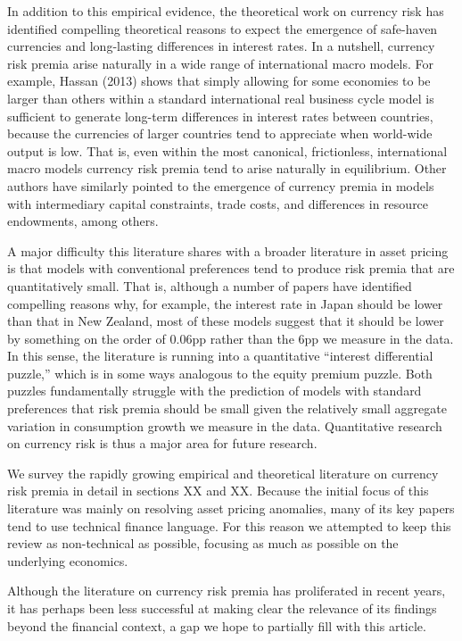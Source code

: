\documentclass[12pt,letter]{article}
\theoremstyle{break} \theorembodyfont{\normalfont\itshape}
\theoremstyle{break}
\theoremstyle{break} \theorembodyfont{\normalfont\itshape}
\theoremstyle{break} \theorembodyfont{\normalfont\itshape}
\begin{document}
In addition to this empirical evidence, the theoretical work on
currency risk has identified compelling theoretical reasons to expect
the emergence of safe-haven currencies and long-lasting differences in
interest rates. In a nutshell, currency risk premia arise naturally in
a wide range of international macro models. For example, Hassan (2013)
shows that simply allowing for some economies to be larger than others
within a standard international real business cycle model is
sufficient to generate long-term differences in interest rates between
countries, because the currencies of larger countries tend to
appreciate when world-wide output is low. That is, even within the
most canonical, frictionless, international macro models currency
risk premia tend to arise naturally in equilibrium. Other authors have
similarly pointed to the emergence of currency premia in models with
intermediary capital constraints, trade costs, and differences in
resource endowments, among others.

A major difficulty this literature shares with a broader literature in
asset pricing is that models with conventional preferences tend to
produce risk premia that are quantitatively small. That is, although a
number of papers have identified compelling reasons why, for example,
the interest rate in Japan should be lower than that in New Zealand,
most of these models suggest that it should be lower by something on
the order of 0.06pp rather than the 6pp we measure in the data. In
this sense, the literature is running into a quantitative ``interest
differential puzzle,'' which is in some ways analogous to the equity
premium puzzle. Both puzzles fundamentally struggle with the
prediction of models with standard preferences that risk premia should
be small given the relatively small aggregate variation in consumption
growth we measure in the data. Quantitative research on currency risk
is thus a major area for future research.

We survey the rapidly growing empirical and theoretical literature on
currency risk premia in detail in sections XX and XX. Because the
initial focus of this literature was mainly on resolving asset pricing
anomalies, many of its key papers tend to use technical finance language.
For this reason we attempted to keep this review as non-technical as
possible, focusing as much as possible on the underlying economics.

Although the literature on currency risk premia has proliferated in
recent years, it has perhaps been less successful at making clear the
relevance of its findings beyond the financial context, a gap we hope to
partially fill with this article.
\end{document}
